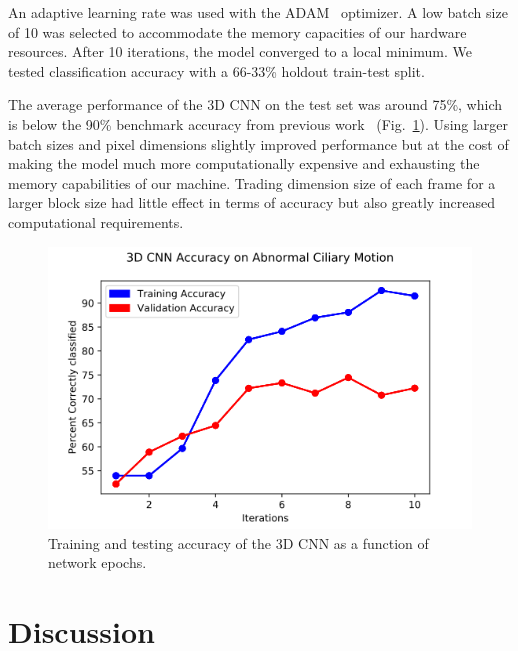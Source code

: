 An adaptive learning rate was used with the ADAM~\cite{kingma2014adam} optimizer. A low batch size of 10 was selected to accommodate the memory capacities of our hardware resources. After 10 iterations, the model converged to a local minimum. We tested classification accuracy with a 66-33\% holdout train-test split. 

The average performance of the 3D CNN on the test set was around 75\%, which is below the 90\% benchmark accuracy from previous work~\cite{quinn2015automated} (Fig.~\ref{fig:iterations}). Using larger batch sizes and pixel dimensions slightly improved performance but at the cost of making the model much more computationally expensive and exhausting the memory capabilities of our machine. Trading dimension size of each frame for a larger block size had little effect in terms of accuracy but also greatly increased computational requirements.  

\begin{figure}
\includegraphics[scale=0.5]{CNN_graph}
\caption{Training and testing accuracy of the 3D CNN as a function of network epochs.}
\label{fig:iterations}

\end{figure}


\section{Discussion}

